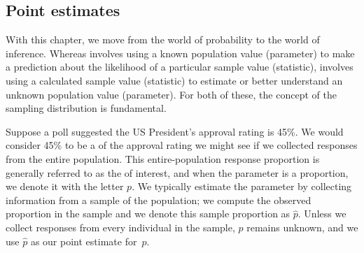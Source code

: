 

\D{\newpage}

\subsection{Point estimates}

With this chapter, we move from the world of probability to the world of inference.  Whereas  involves using a known population value (parameter) to make a prediction about the likelihood of a particular sample value (statistic),  involves using a calculated sample value (statistic) to estimate or better understand an unknown population value (parameter).  For both of these, the concept of the sampling distribution is fundamental.  

Suppose a poll suggested the US President's approval
rating is 45\%.
We would consider 45\% to be a
 of the approval
rating we might see if we collected responses from the
entire population.  This entire-population response proportion is
generally referred to as the 
of interest,
and when the parameter is a proportion,
we denote it with the letter $p$. We typically estimate the parameter by collecting
information from a sample of the population;
we compute the observed proportion in the sample and we denote this sample proportion as $\hat{p}$.  Unless we collect responses from every individual in the sample,
$p$ remains unknown, and we use $\hat{p}$ as our point estimate for~$p$.

